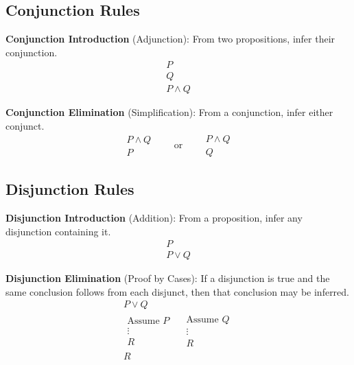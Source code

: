\subsection{Conjunction Rules}

\begin{definition}
\textbf{Conjunction Introduction} (Adjunction): From two propositions, infer
their conjunction.
\[
\begin{array}{l}
P \\
Q \\ \hline
P \wedge Q
\end{array}
\]
\end{definition}

\begin{definition}
\textbf{Conjunction Elimination} (Simplification): From a conjunction, infer
either conjunct.
\[
\begin{array}{l}
P \wedge Q \\ \hline
P
\end{array}
\qquad\text{or}\qquad
\begin{array}{l}
P \wedge Q \\ \hline
Q
\end{array}
\]
\end{definition}

\subsection{Disjunction Rules}

\begin{definition}
\textbf{Disjunction Introduction} (Addition): From a proposition, infer any
disjunction containing it.
\[
\begin{array}{l}
P \\ \hline
P \vee Q
\end{array}
\]
\end{definition}

\begin{definition}
\textbf{Disjunction Elimination} (Proof by Cases): If a disjunction is true and
the same conclusion follows from each disjunct, then that conclusion may be
inferred.
\[
\begin{array}{l}
P \vee Q \\
\begin{array}{l}
\text{Assume } P \\ \vdots \\ R
\end{array}
\quad
\begin{array}{l}
\text{Assume } Q \\ \vdots \\ R
\end{array}
\\ \hline
R
\end{array}
\]
\end{definition}

